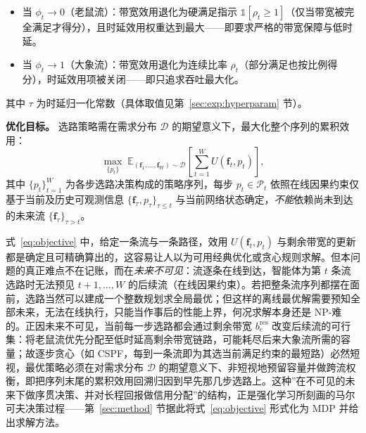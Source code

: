 \begin{itemize}
\item 当 $\phi_t\!\to\!0$（老鼠流）：带宽效用退化为硬满足指示 $\mathbb{1}[\rho_t\!\ge\!1]$（仅当带宽被完全满足才得分），且时延效用权重达到最大——即要求严格的带宽保障与低时延。
\item 当 $\phi_t\!\to\!1$（大象流）：带宽效用退化为连续比率 $\rho_t$（部分满足也按比例得分），时延效用项被关闭——即只追求吞吐最大化。
\end{itemize}
其中 $\tau$ 为时延归一化常数（具体取值见第~\ref{sec:exp:hyperparam} 节）。

\textbf{优化目标。} 选路策略需在需求分布 $\mathcal{D}$ 的期望意义下，最大化整个序列的累积效用：
\begin{equation}
\max_{\{p_t\}}\;
\mathbb{E}_{(\mathbf{f}_1,\dots,\mathbf{f}_W)\sim\mathcal{D}}
\left[\sum_{t=1}^{W} U(\mathbf{f}_t, p_t)\right],
\label{eq:objective}
\end{equation}
其中 $\{p_t\}_{t=1}^{W}$ 为各步选路决策构成的策略序列，每步 $p_t\in\mathcal{P}_t$ 依照在线因果约束仅基于当前及历史可观测信息 $\{\mathbf{f}_\tau, p_\tau\}_{\tau\le t}$ 与当前网络状态确定，\emph{不能}依赖尚未到达的未来流 $\{\mathbf{f}_\tau\}_{\tau>t}$。

式~\eqref{eq:objective} 中，给定一条流与一条路径，效用 $U(\mathbf{f}_t,p_t)$ 与剩余带宽的更新都是确定且可精确算出的，这容易让人以为可用经典优化或贪心规则求解。但本问题的真正难点不在记账，而在\emph{未来不可见}：流逐条在线到达，智能体为第 $t$ 条流选路时无法预见 $t+1,\dots,W$ 的后续流（在线因果约束）。若把整条流序列都摆在面前，选路当然可以建成一个整数规划求全局最优；但这样的离线最优解需要预知全部未来，无法在线执行，只能当作事后的性能上界，何况求解本身还是 NP-难的。正因未来不可见，当前每一步选路都会通过剩余带宽 $b_e^{\text{res}}$ 改变后续流的可行集：将老鼠流优先分配至低时延高剩余带宽链路，可能耗尽后来大象流所需的容量；故逐步贪心（如 CSPF，每到一条流即为其选当前满足约束的最短路）必然短视，最优策略必须在对需求分布 $\mathcal{D}$ 的期望意义下、非短视地预留容量并做跨流权衡，即把序列末尾的累积效用回溯归因到早先那几步选路上。这种”在不可见的未来下做序贯决策、并对长程回报做信用分配”的结构，正是强化学习所刻画的马尔可夫决策过程——第~\ref{sec:method} 节据此将式~\eqref{eq:objective} 形式化为 MDP 并给出求解方法。

\label{sec:problem:why_rl}